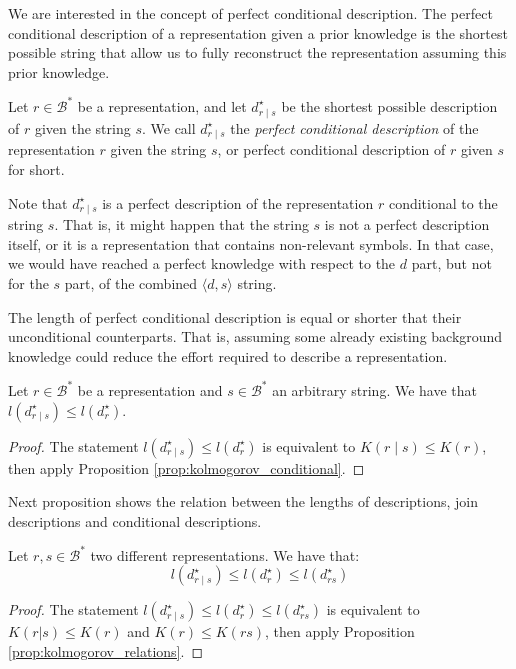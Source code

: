 We are interested in the concept of perfect conditional description. The perfect conditional description of a representation given a prior knowledge is the shortest possible string that allow us to fully reconstruct the representation assuming this prior knowledge.

\begin{definition}
Let $r \in \mathcal{B}^\ast$ be a representation, and let $d^\star_{r \mid s}$ be the shortest possible description of $r$ given the string $s$. We call $d^\star_{r \mid s}$ the \emph{perfect conditional description} of the representation $r$ given the string $s$, or perfect conditional description of $r$ given $s$ for short.
\end{definition}

Note that $d^\star_{r \mid s}$ is a perfect description of the representation $r$ conditional to the string $s$. That is, it might happen that the string $s$ is not a perfect description itself, or it is a representation that contains non-relevant symbols. In that case, we would have reached a perfect knowledge with respect to the $d$ part, but not for the $s$ part, of the combined $\langle d, s \rangle$ string.

The length of perfect conditional description is equal or shorter that their unconditional counterparts. That is, assuming some already existing background knowledge could reduce the effort required to describe a representation.

\begin{proposition}
\label{prop:description_conditional_inequality}
Let $r \in \mathcal{B}^\ast$ be a representation and $s \in \mathcal{B}^\ast$ an arbitrary string. We have that $l \left( d^\star_{r \mid s} \right) \leq l \left( d^\star_r \right)$.
\end{proposition}
\begin{proof}
The statement $l \left( d^\star_{r \mid s} \right) \leq l \left( d^\star_r \right)$ is equivalent to $K(r \mid s) \leq K(r)$, then apply Proposition \ref{prop:kolmogorov_conditional}.
\end{proof}

Next proposition shows the relation between the lengths of descriptions, join descriptions and conditional descriptions.

\begin{proposition}
\label{prop:description_conditional_joint}
Let $r, s \in \mathcal{B}^\ast$ two different representations. We have that:
\[
l \left( d^\star_{r \mid s} \right) \leq l \left( d^\star_r \right) \leq l \left( d^\star_{rs} \right)
\]
\end{proposition}
\begin{proof}
The statement $l \left( d^\star_{r \mid s} \right) \leq l \left( d^\star_r \right) \leq l \left( d^\star_{rs} \right)$ is equivalent to $K(r | s ) \leq K(r)$ and $K(r) \leq K(rs)$, then apply Proposition \ref{prop:kolmogorov_relations}.
\end{proof}

